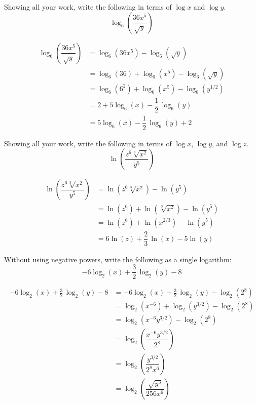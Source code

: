 \documentclass[11pt,letterpaper]{article}
\begin{document}
\newpage



 Showing all your work, write the following in terms of $\log x$ and $\log y$.
	\[
	\log_6\left( \dfrac{36x^5}{\sqrt{y}} \right)
	\] \pspace

\sol
	\[
	\begin{aligned}
	\log_6\left( \dfrac{36x^5}{\sqrt{y}} \right)&= \log_6(36x^5) - \log_6(\sqrt{y}) \\[0.3cm]
	&= \log_6(36) + \log_6(x^5) - \log_6(\sqrt{y}) \\[0.3cm]
	&= \log_6(6^2) + \log_6(x^5) - \log_6(y^{1/2}) \\[0.3cm]
	&= 2 + 5\log_6(x) - \dfrac{1}{2}\,\log_6(y) \\[0.3cm]
	&= 5\log_6(x) - \dfrac{1}{2}\,\log_6(y) + 2 
	\end{aligned}
	\]



\newpage



 Showing all your work, write the following in terms of $\log x$, $\log y$, and $\log z$. 
	\[
	\ln\left( \dfrac{z^6 \sqrt[3]{x^2}}{y^5} \right)
	\] \pspace

\sol
	\[
	\begin{aligned}
	\ln\left( \dfrac{z^6 \sqrt[3]{x^2}}{y^5} \right)&= \ln(z^6 \sqrt[3]{x^2}) - \ln(y^5) \\[0.3cm]
	&= \ln(z^6) + \ln(\sqrt[3]{x^2}) - \ln(y^5) \\[0.3cm]
	&= \ln(z^6) + \ln(x^{2/3}) - \ln(y^5) \\[0.3cm]
	&= 6\ln(z) + \dfrac{2}{3}\, \ln(x) - 5\ln(y) 
	\end{aligned}
	\]



\newpage



 Without using negative powers, write the following as a single logarithm: 
	\[
	-6\log_2(x) + \frac{3}{2}\, \log_2(y) - 8
	\] \pspace

\sol
	\[
	\begin{aligned}
	-6\log_2(x) + \frac{3}{2}\, \log_2(y) - 8&= -6\log_2(x) + \frac{3}{2}\, \log_2(y) - \log_2(2^8) \\[0.3cm]
	&= \log_2(x^{-6}) + \log_2(y^{3/2}) - \log_2(2^8) \\[0.3cm]
	&= \log_2(x^{-6} y^{3/2}) - \log_2(2^8) \\[0.3cm]
	&= \log_2 \left( \dfrac{x^{-6} y^{3/2}}{2^8} \right) \\[0.3cm]
	&= \log_2 \left( \dfrac{y^{3/2}}{2^8x^6} \right) \\[0.3cm]
	&= \log_2 \left( \dfrac{\sqrt{y^3}}{256x^6} \right) 
	\end{aligned}
	\]
\end{document}

